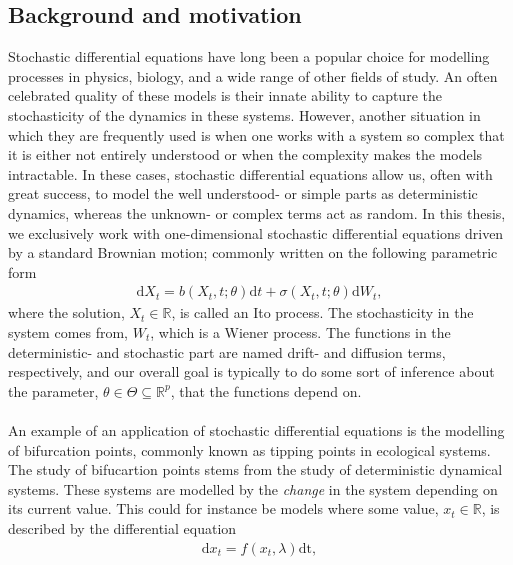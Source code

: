 \subsection{Background and motivation}
Stochastic differential equations have long been a popular choice for modelling processes in physics, biology, and a wide range of other fields of study. An often celebrated quality of these models is their innate ability to capture the stochasticity of the dynamics in these systems. However, another situation in which they are frequently used is when one works with a system so complex that it is either not entirely understood or when the complexity makes the models intractable. In these cases, stochastic differential equations allow us, often with great success, to model the well understood- or simple parts as deterministic dynamics, whereas the unknown- or complex terms act as random. In this thesis, we exclusively work with one-dimensional stochastic differential equations driven by a standard Brownian motion; commonly written on the following parametric form
\begin{align}
    \mathrm{d}X_t = b(X_t, t;\theta)\mathrm{d}t + \sigma\left(X_t, t; \theta\right)\mathrm{d}W_t,
\end{align}
where the solution, $X_t\in\mathbb{R}$, is called an Ito process. The stochasticity in the system comes from, $W_t$, which is a Wiener process. The functions in the deterministic- and stochastic part are named drift- and diffusion terms, respectively, and our overall goal is typically to do some sort of inference about the parameter, $\theta\in\Theta\subseteq\mathbb{R}^p$, that the functions depend on. \\\\
An example of an application of stochastic differential equations is the modelling of bifurcation points, commonly known as tipping points in ecological systems. The study of bifucartion points stems from the study of deterministic dynamical systems. These systems are modelled by the \textit{change} in the system depending on its current value. This could for instance be models where some value, $x_t\in\mathbb{R}$, is described by the differential equation
\begin{align}
    \mathrm{d}x_t = f(x_t, \lambda)\mathrm{dt},
\end{align}
